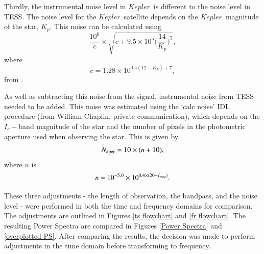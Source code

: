 \documentclass[a4paper,fleqn,usenatbib,useAMS]{mnras}
\newcommand{\kep}{\ensuremath{Kepler}}
\begin{document}
\fi
Thirdly, the instrumental noise level in \kep \ is different to the noise level in TESS. The noise level for the \kep \ satellite depends on the \kep \ magnitude of the star, $K_{p}$. This noise can be calculated using
\begin{equation}
\label{eq:kep noise}
\frac{10^{6}}{c} \times \sqrt{c+9.5 \times 10^{5}\Bigg(\frac{14}{K_{p}}\Bigg)^{5}} ,
\end{equation}
where
\begin{equation}
c = 1.28 \times 10^{0.4(12-K_{p})+7} ,
\end{equation}
from \citet{chaplin_predicting_2011}.

As well as subtracting this noise from the signal, instrumental noise from TESS needed to be added. This noise was estimated using the `calc noise' IDL procedure (from William Chaplin, private communication), which depends on the $I_{c}-$band magnitude of the star and the number of pixels in the photometric aperture used when observing the star. This is given by
\begin{equation}
N_{\rm aper} = 10 \times (n+10) , 
\end{equation}
where $n$ is
\begin{equation}
\label{eq:tess noise}
n = 10^{-5.0} \times 10^{ 0.4 \times (20-I_{\rm mag})} .
\end{equation}

These three adjustments - the length of observation, the bandpass, and the noise level - were performed in both the time and frequency domains for comparison. The adjustments are outlined in Figures \ref{ts flowchart} and \ref{fr flowchart}. The resulting Power Spectra are compared in Figures \ref{Power Spectra} and \ref{overplotted PS}. After comparing the results, the decision was made to perform adjustments in the time domain before transforming to frequency. 
\end{document}

